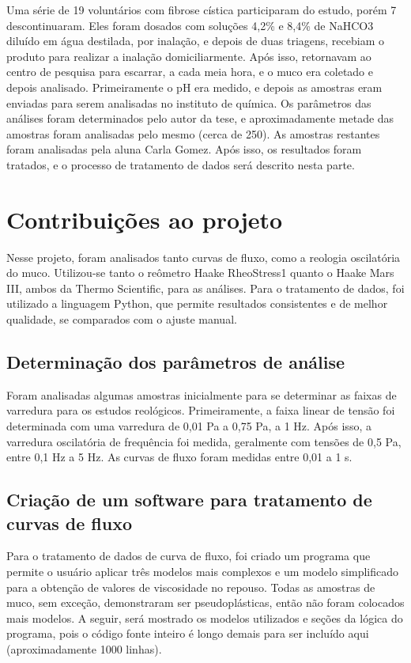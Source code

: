 	Uma série de 19 voluntários com fibrose cística participaram do estudo, porém 7 descontinuaram. Eles foram dosados com soluções 4,2\% e 8,4\% de NaHCO3 diluído em água destilada, por inalação, e depois de duas triagens, recebiam o produto para realizar a inalação domiciliarmente. Após isso, retornavam ao centro de pesquisa para escarrar, a cada meia hora, e o muco era coletado e depois analisado. Primeiramente o pH era medido, e depois as amostras eram enviadas para serem analisadas no instituto de química. Os parâmetros das análises foram determinados pelo autor da tese, e aproximadamente metade das amostras foram analisadas pelo mesmo (cerca de 250). As amostras restantes foram analisadas pela aluna Carla Gomez. Após isso, os resultados foram tratados, e o processo de tratamento de dados será descrito nesta parte.


	\chapter{Contribuições ao projeto}
	
	Nesse projeto, foram analisados tanto curvas de fluxo, como a reologia oscilatória do muco. Utilizou-se tanto o reômetro Haake RheoStress1 quanto o Haake Mars III, ambos da Thermo Scientific, para as análises. Para o tratamento de dados, foi utilizado a linguagem Python, que permite resultados consistentes e de melhor qualidade, se comparados com o ajuste manual.
	
		\section{Determinação dos parâmetros de análise}
		
		Foram analisadas algumas amostras inicialmente para se determinar as faixas de varredura para os estudos reológicos. Primeiramente, a faixa linear de tensão foi determinada com uma varredura de 0,01 Pa a 0,75 Pa, a 1 Hz. Após isso, a varredura oscilatória de frequência foi medida, geralmente com tensões de 0,5 Pa, entre 0,1 Hz a 5 Hz. As curvas de fluxo foram medidas entre 0,01 a 1 s\menosUm.
	
		\section{Criação de um software para tratamento de curvas de fluxo}
		\label{sec:apn_tratamento_CF}
		Para o tratamento de dados de curva de fluxo, foi criado um programa que permite o usuário aplicar três modelos mais complexos e um modelo simplificado para a obtenção de valores de viscosidade no repouso. Todas as amostras de muco, sem exceção, demonstraram ser pseudoplásticas, então não foram colocados mais modelos. A seguir, será mostrado os modelos utilizados e seções da lógica do programa, pois o código fonte inteiro é longo demais para ser incluído aqui (aproximadamente 1000 linhas).
		
